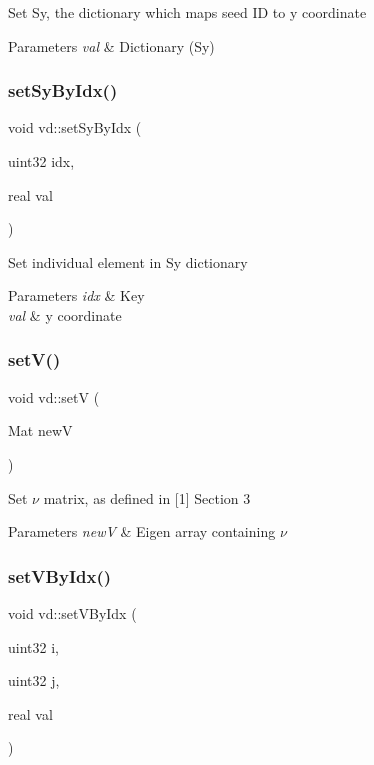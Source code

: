 Set Sy, the dictionary which maps seed ID to y coordinate 
\begin{DoxyParams}{Parameters}
{\em val} & Dictionary (Sy) \\
\hline
\end{DoxyParams}
\mbox{\label{classvd_a5407f9c20ed4ff2300ccbebb999d1dde}} 
\subsubsection{\texorpdfstring{set\+Sy\+By\+Idx()}{setSyByIdx()}}
{\footnotesize\ttfamily void vd\+::set\+Sy\+By\+Idx (\begin{DoxyParamCaption}\item[{uint32}]{idx,  }\item[{real}]{val }\end{DoxyParamCaption})}

Set individual element in Sy dictionary 
\begin{DoxyParams}{Parameters}
{\em idx} & Key \\
\hline
{\em val} & y coordinate \\
\hline
\end{DoxyParams}
\mbox{\label{classvd_a33e792915ebd0295a3475fe686b41ee9}} 
\subsubsection{\texorpdfstring{set\+V()}{setV()}}
{\footnotesize\ttfamily void vd\+::setV (\begin{DoxyParamCaption}\item[{Mat}]{newV }\end{DoxyParamCaption})}

Set $\nu$ matrix, as defined in \mbox{[}1\mbox{]} Section 3 
\begin{DoxyParams}{Parameters}
{\em newV} & Eigen array containing $\nu$ \\
\hline
\end{DoxyParams}
\mbox{\label{classvd_a29670919bb8d5b2f2f0235ddfda6484e}} 
\subsubsection{\texorpdfstring{set\+V\+By\+Idx()}{setVByIdx()}}
{\footnotesize\ttfamily void vd\+::set\+V\+By\+Idx (\begin{DoxyParamCaption}\item[{uint32}]{i,  }\item[{uint32}]{j,  }\item[{real}]{val }\end{DoxyParamCaption})}

